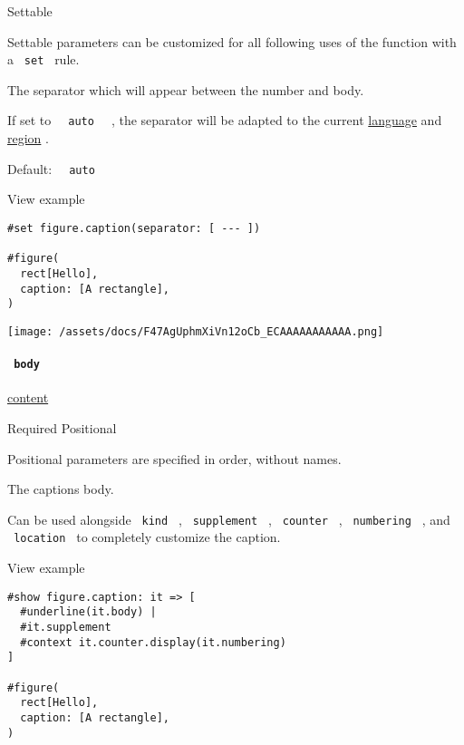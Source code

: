 {{ Settable }}

\label{definitions-caption-separator-settable-tooltip}
Settable parameters can be customized for all following uses of the
function with a \texttt{\ set\ } rule.

The separator which will appear between the number and body.

If set to \texttt{\ }{\texttt{\ auto\ }}\texttt{\ } , the separator will
be adapted to the current
\href{/docs/reference/text/text/\#parameters-lang}{language} and
\href{/docs/reference/text/text/\#parameters-region}{region} .

Default: \texttt{\ }{\texttt{\ auto\ }}\texttt{\ }


View example

\begin{verbatim}
#set figure.caption(separator: [ --- ])

#figure(
  rect[Hello],
  caption: [A rectangle],
)
\end{verbatim}

\texttt{[image: /assets/docs/F47AgUphmXiVn12oCb\_ECAAAAAAAAAAA.png]}

\paragraph{\texorpdfstring{\texttt{\ body\ }}{ body }}\label{definitions-caption-body}

\href{/docs/reference/foundations/content/}{content}

{Required} {{ Positional }}

\label{definitions-caption-body-positional-tooltip}
Positional parameters are specified in order, without names.

The caption\textquotesingle s body.

Can be used alongside \texttt{\ kind\ } , \texttt{\ supplement\ } ,
\texttt{\ counter\ } , \texttt{\ numbering\ } , and
\texttt{\ location\ } to completely customize the caption.


View example

\begin{verbatim}
#show figure.caption: it => [
  #underline(it.body) |
  #it.supplement
  #context it.counter.display(it.numbering)
]

#figure(
  rect[Hello],
  caption: [A rectangle],
)
\end{verbatim}


